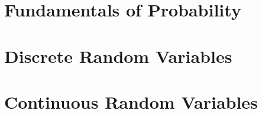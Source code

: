 \documentclass[british,11pt,a4paper]{report}
\begin{document}
\maketitle
\tableofcontents
\chapter{Fundamentals of Probability}

\chapter{Discrete Random Variables}

\chapter{Continuous Random Variables}

\end{document}
